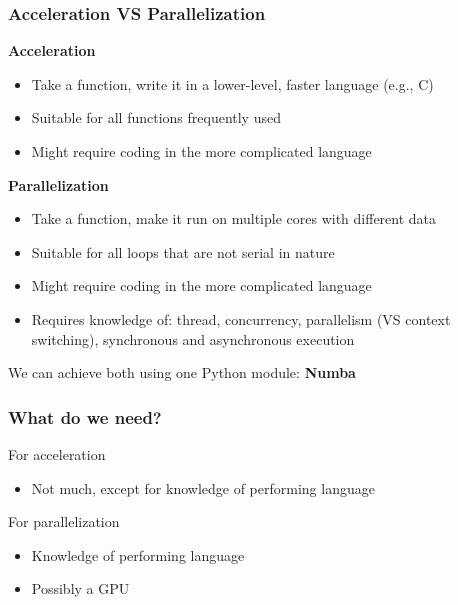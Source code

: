 \documentclass[10pt, aspectratio=1610]{beamer}
\begin{document}
\begin{frame}
  \frametitle{Acceleration VS Parallelization}

  \textbf{Acceleration}
  \begin{itemize}
    \item Take a function, write it in a lower-level, faster language (e.g., C)
    \item Suitable for all functions frequently used
    \item Might require coding in the more complicated language
  \end{itemize}

  \vfill

  \textbf{Parallelization}
  \begin{itemize}
    \item Take a function, make it run on multiple cores with different data
    \item Suitable for all loops that are not serial in nature
    \item Might require coding in the more complicated language
    \item Requires knowledge of: thread, concurrency, parallelism (VS context switching), synchronous and asynchronous execution
  \end{itemize}

  \vfill
  We can achieve both using one Python module: \textbf{Numba}

\end{frame}

\begin{frame}
  \frametitle{What do we need?}

  For acceleration
  \begin{itemize}
    \item Not much, except for knowledge of performing language
  \end{itemize}

  \vfill
  For parallelization
  \begin{itemize}
    \item Knowledge of performing language
    \item Possibly a GPU
  \end{itemize}

\end{frame}
\end{document}
